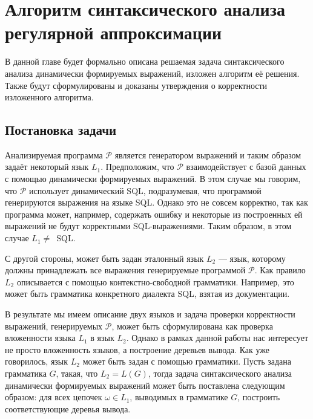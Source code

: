 \chapter{Алгоритм синтаксического анализа регулярной аппроксимации} \label{relWorks}

В данной главе будет формально описана решаемая задача синтаксического анализа динамически формируемых выражений, изложен алгоритм её решения. Также будут сформулированы и доказаны утверждения о корректности изложенного алгоритма.

\section{Постановка задачи}

Анализируемая программа $\mathcal{P}$ является генератором выражений и таким образом задаёт некоторый язык $L_1$. Предположим, что $\mathcal{P}$ взаимодействует с базой данных с помощью динамически формируемых выражений. В этом случае мы говорим, что $\mathcal{P}$ использует динамический SQL, подразумевая, что программой генерируются выражения на языке SQL. Однако это не совсем корректно, так как программа может, например, содержать ошибку и некоторые из построенных ей выражений не будут корректными SQL-выражениями. Таким образом, в этом случае $L_1\neq$~SQL.

С другой стороны, может быть задан эталонный язык $L_2$ --- язык, которому должны принадлежать все выражения генерируемые программой $\mathcal{P}$. Как правило $L_2$ описывается с помощью контекстно-свободной грамматики. Например, это может быть грамматика конкретного диалекта SQL, взятая из документации.

В результате мы имеем описание двух языков и задача проверки корректности выражений, генерируемых $\mathcal{P}$, может быть сформулирована как проверка вложенности языка $L_1$ в язык $L_2$. Однако в рамках данной работы нас интересует не просто вложенность языков, а построение деревьев вывода. Как уже говорилось, язык $L_2$ может быть задан с помощью грамматики. Пусть задана грамматика $G$, такая, что $L_2 = L(G)$, тогда задача синтаксического анализа динамически формируемых выражений может быть поставлена следующим образом: для всех цепочек $\omega \in L_1$, выводимых в грамматике $G$, построить соответствующие деревья вывода.

